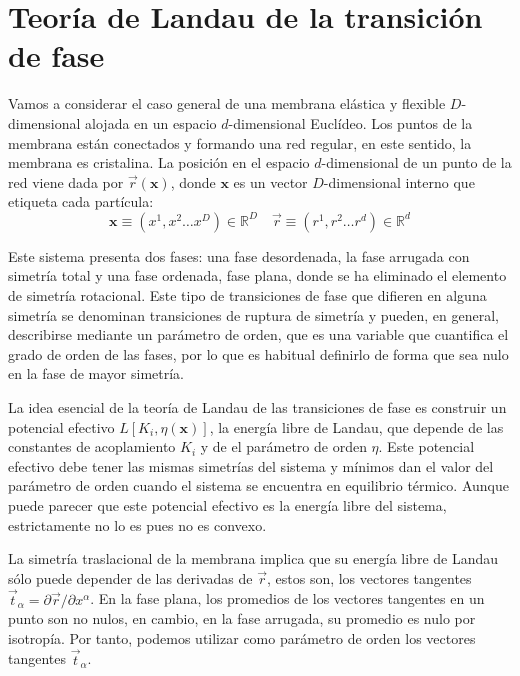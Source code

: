 \section{Teoría de Landau de la transición de fase}

Vamos a considerar el caso general de una membrana elástica y flexible
$D$-dimensional alojada en un espacio $d$-dimensional Euclídeo. Los puntos
de la membrana están conectados y formando una red regular, en este
sentido, la membrana es cristalina. La posición en el espacio $d$-dimensional
de un punto de la red viene dada por $\vec{r}(\mathbf{x})$, donde $\mathbf{x}$
es un vector $D$-dimensional interno que etiqueta cada partícula:
$$\mathbf{x}\equiv (x^1,x^2 \dots x^D)\in \mathbb{R}^D \quad \vec{r}\equiv (r^1,r^2 \dots r^d)\in \mathbb{R}^d$$

Este sistema presenta dos fases: una fase desordenada, la fase arrugada con
simetría total y una fase ordenada, fase plana, donde se ha eliminado el
elemento de simetría rotacional. Este tipo de transiciones de fase que
difieren en alguna simetría se denominan transiciones de ruptura de simetría y
pueden, en general, describirse mediante un parámetro de orden, que es una
variable que cuantifica el grado de orden de las fases, por lo que es habitual
definirlo de forma que sea nulo en la fase de mayor simetría.

La idea esencial de la teoría de Landau de las transiciones de fase es
construir un potencial efectivo $L[K_i,\eta(\mathbf{x})]$, la energía libre de
Landau, que depende de las constantes de acoplamiento $K_i$ y de el parámetro
de orden $\eta$. Este potencial efectivo debe tener las mismas simetrías del
sistema y mínimos dan el valor del parámetro de orden cuando el sistema se
encuentra en equilibrio térmico. Aunque puede parecer que este
potencial efectivo es la energía libre del sistema, estrictamente no
lo es pues no es convexo.

La simetría traslacional de la membrana implica que su energía libre de Landau
sólo puede depender de las derivadas de $\vec{r}$, estos son, los vectores
tangentes $\vec{t}_{\alpha}=\partial \vec{r}/\partial x^{\alpha} $. En la fase
plana, los promedios de los vectores tangentes en un punto son no nulos, en
cambio, en la fase arrugada, su promedio es nulo por isotropía. Por tanto,
podemos utilizar como  parámetro de orden los vectores tangentes
$\vec{t}_{\alpha}$.

